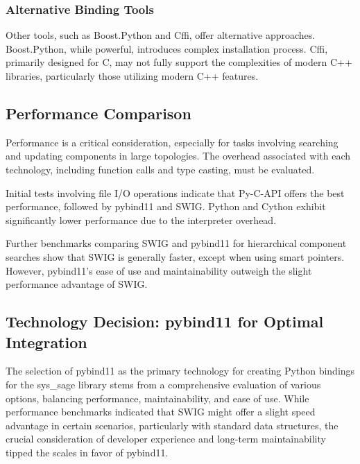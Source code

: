 \subsubsection{Alternative Binding Tools}

Other tools, such as Boost.Python and Cffi, offer alternative approaches. Boost.Python, while powerful, introduces complex installation process. Cffi, primarily designed for C, may not fully support the complexities of modern C++ libraries, particularly those utilizing modern C++ features. \cite{boost-docu} \cite{cffi-docu}
\subsection{Performance Comparison}

Performance is a critical consideration, especially for tasks involving searching and updating components in large topologies. The overhead associated with each technology, including function calls and type casting, must be evaluated.

Initial tests involving file I/O operations indicate that Py-C-API offers the best performance, followed by pybind11 and SWIG. Python and Cython exhibit significantly lower performance due to the interpreter overhead.



Further benchmarks comparing SWIG and pybind11 for hierarchical component searches show that SWIG is generally faster, except when using smart pointers. However, pybind11's ease of use and maintainability outweigh the slight performance advantage of SWIG.






\subsection{Technology Decision: pybind11 for Optimal Integration}

The selection of pybind11 as the primary technology for creating Python bindings for the sys\_sage library stems from a comprehensive evaluation of various options, balancing performance, maintainability, and ease of use. While performance benchmarks indicated that SWIG might offer a slight speed advantage in certain scenarios, particularly with standard data structures, the crucial consideration of developer experience and long-term maintainability tipped the scales in favor of pybind11.

